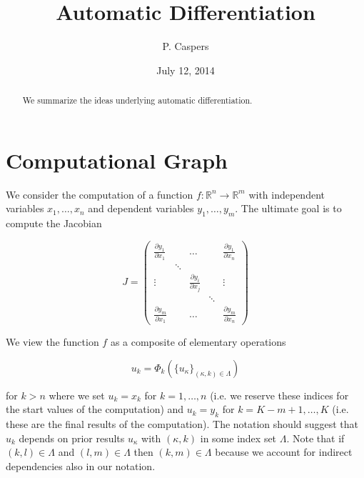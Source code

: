\documentclass{amsart}
\theoremstyle{plain}
\numberwithin{equation}{section}
\begin{document}
\title[AD]{Automatic Differentiation}
\author{P. Caspers}
\date{July 12, 2014}
\begin{abstract}
We summarize the ideas underlying automatic differentiation.
\end{abstract}

\maketitle

\tableofcontents

\section{Computational Graph}

We consider the computation of a function $f: \mathbb{R}^n \rightarrow \mathbb{R}^m$ with independent variables $x_1, \dots , x_n$ and dependent variables $y_1, \dots , y_m$. The ultimate goal is to compute the Jacobian

\begin{equation}
J = \begin{pmatrix}
\frac{\partial y_1}{\partial x_1} &  & \dots &  & \frac{\partial y_1}{\partial x_n} \\
 & \ddots & & & \\
\vdots &  & \frac{\partial y_i}{\partial x_j} &  & \vdots \\
 &  &                                   & \ddots & \\
\frac{\partial y_m}{\partial x_1} & & \dots & & \frac{\partial y_m}{\partial x_n}
\end{pmatrix}
\end{equation}

We view the function $f$ as a composite of elementary operations

\begin{equation}
u_k = \Phi_k( \{u_\kappa\}_{(\kappa,k) \in \Lambda})
\end{equation}

for $k > n$ where we set $u_k = x_k$ for $k=1,\dots,n$ (i.e. we reserve these indices for the start values of the computation) and $u_k = y_k$ for $k=K-m+1, \dots, K$ (i.e. these are the final results of the computation). The notation should suggest that $u_k$ depends on prior results $u_\kappa$ with $(\kappa,k)$ in some index set $\Lambda$. Note that if $(k,l)\in\Lambda$ and $(l,m)\in\Lambda$ then $(k,m)\in\Lambda$ because we account for indirect dependencies also in our notation.
\end{document}
